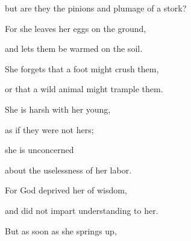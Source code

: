 {\par }{\Q but are they the pinions
and plumage
of a stork?
\par }{\Q {}For
she leaves
her eggs
on the ground,
\par }{\Q and lets them be warmed
on
the soil.
\par }{\Q {}She forgets
that
a foot
might crush
them,
\par }{\Q or that a wild
animal
might trample them.
\par }{\Q {}She is harsh
with her young,
\par }{\Q as if they were not
hers;
\par }{\Q she is unconcerned
\par }{\Q about
the uselessness
of her labor.
\par }{\Q {}For
God
deprived
her of wisdom,
\par }{\Q and did not
impart
understanding to her.
\par }{\Q {}But as soon as she springs up,

}
